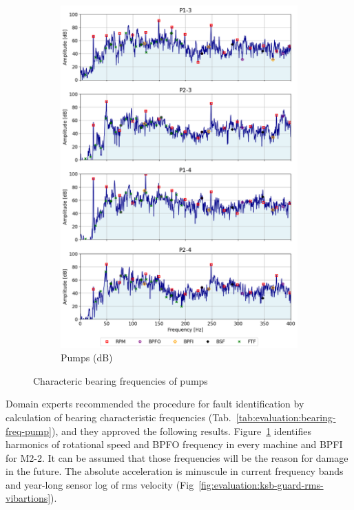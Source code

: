 \begin{figure}[h]
\begin{subfigure}[b]{0.24\textwidth}
        \includegraphics[width=\textwidth]{assets/results/defects/pumps-dB.png}
        \caption{Pumps (dB)}
    \end{subfigure}
    \caption{Characteric bearing frequencies of pumps}
    \label{fig:evaluation:bearing-freq}
\end{figure}

Domain experts recommended the procedure for fault identification by calculation of bearing characteristic frequencies (Tab.~\ref{tab:evaluation:bearing-freq-pump}), and they approved the following results. Figure~\ref{fig:evaluation:bearing-freq} identifies harmonics of rotational speed and BPFO frequency in every machine and BPFI for M2-2. It can be assumed that those frequencies will be the reason for damage in the future. The absolute acceleration is minuscule in current frequency bands and year-long sensor log of rms velocity (Fig~\ref{fig:evaluation:ksb-guard-rms-vibartions}).

